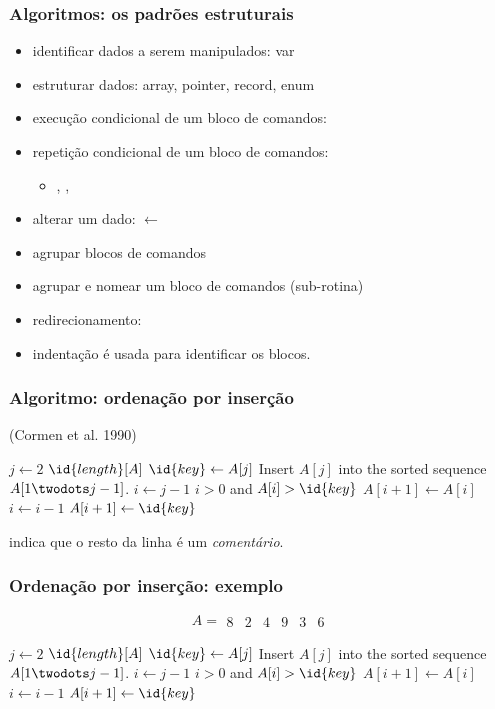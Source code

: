 \documentclass{beamer}
\begin{document}
\begin{frame}

  \frametitle{Algoritmos: os padrões estruturais}

  \begin{itemize}
  \item identificar dados a serem manipulados: var
  \item estruturar dados: array, pointer, record, enum
  \item execução condicional de um bloco de comandos: \If 
  \item repetição condicional de um bloco de comandos: \While
    \begin{itemize}
    \item \For, \To, \Downto
    \end{itemize}
  \item alterar um dado: $\gets$
  \item agrupar blocos de comandos
  \item agrupar e nomear um bloco de comandos (sub-rotina)
  \item redirecionamento: \Goto
  \item indentação é usada para identificar os blocos.
  \end{itemize}
\end{frame}

\begin{frame}

  \frametitle{Algoritmo: ordenação por inserção}

(Cormen et al. 1990)

\begin{codebox}
\li \For $j \gets 2$ \To $\id{length}[A]$
\li     \Do
$\id{key} \gets A[j]$
\li
\Comment Insert $A[j]$ into the sorted sequence
    $A[1 \twodots j-1]$.
\li $i \gets j-1$
\li \While $i > 0$ and $A[i] > \id{key}$
\li    \Do
        $A[i+1] \gets A[i]$
\li     $i \gets i-1$
    \End
\li $A[i+1] \gets \id{key}$
\End
\end{codebox}  
\Comment indica que o resto da linha é um \emph{comentário}.
\end{frame}

\begin{frame}

  \frametitle{Ordenação por inserção: exemplo}

  \[
  A = \begin{array}{cccccc}
8 & 2 & 4 & 9 & 3 & 6
\end{array}
\]


\begin{codebox}
\li \For $j \gets 2$ \To $\id{length}[A]$
\li     \Do
$\id{key} \gets A[j]$
\li
\Comment Insert $A[j]$ into the sorted sequence
    $A[1 \twodots j-1]$.
\li $i \gets j-1$
\li \While $i > 0$ and $A[i] > \id{key}$
\li    \Do
        $A[i+1] \gets A[i]$
\li     $i \gets i-1$
    \End
\li $A[i+1] \gets \id{key}$
\End
\end{codebox}  

\end{frame}
\end{document}
